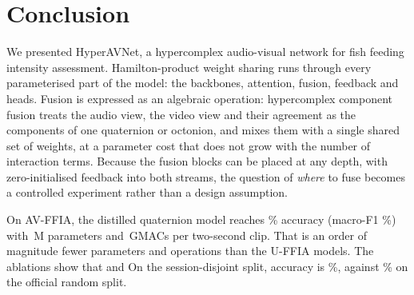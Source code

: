 \section{Conclusion}
\label{sec:conclusion}

We presented HyperAVNet, a hypercomplex audio-visual network for fish feeding intensity assessment.
Hamilton-product weight sharing runs through every parameterised part of the model: the backbones,
attention, fusion, feedback and heads. Fusion is expressed as an algebraic operation: hypercomplex
component fusion treats the audio view, the video view and their agreement as the components of one
quaternion or octonion, and mixes them with a single shared set of weights, at a parameter cost that
does not grow with the number of interaction terms. Because the fusion blocks can be placed at any
depth, with zero-initialised feedback into both streams, the question of \emph{where} to fuse becomes a
controlled experiment rather than a design assumption.

On AV-FFIA, the distilled quaternion model reaches \resOurAcc\% accuracy (macro-F1 \resOurFone\%) with
\resOurParams\,M parameters and \resOurGMACs\,GMACs per two-second clip. That is an order of
magnitude fewer parameters and operations than the U-FFIA models.  The ablations show that
and 
On the session-disjoint split, accuracy is \resGroupedAcc\%, against \resOfficialAcc\% on the official
random split. 

